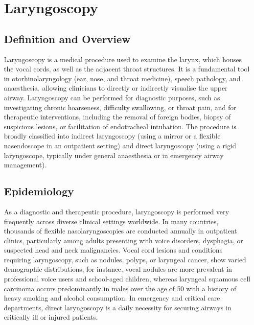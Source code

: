 \chapter{Laryngoscopy}

\section*{Definition and Overview}
Laryngoscopy is a medical procedure used to examine the larynx, which houses the vocal cords, as well as the adjacent throat structures. It is a fundamental tool in otorhinolaryngology (ear, nose, and throat medicine), speech pathology, and anaesthesia, allowing clinicians to directly or indirectly visualise the upper airway. Laryngoscopy can be performed for diagnostic purposes, such as investigating chronic hoarseness, difficulty swallowing, or throat pain, and for therapeutic interventions, including the removal of foreign bodies, biopsy of suspicious lesions, or facilitation of endotracheal intubation. The procedure is broadly classified into indirect laryngoscopy (using a mirror or a flexible nasendoscope in an outpatient setting) and direct laryngoscopy (using a rigid laryngoscope, typically under general anaesthesia or in emergency airway management).

\section*{Epidemiology}
As a diagnostic and therapeutic procedure, laryngoscopy is performed very frequently across diverse clinical settings worldwide. In many countries, thousands of flexible nasolaryngoscopies are conducted annually in outpatient clinics, particularly among adults presenting with voice disorders, dysphagia, or suspected head and neck malignancies. Vocal cord lesions and conditions requiring laryngoscopy, such as nodules, polyps, or laryngeal cancer, show varied demographic distributions; for instance, vocal nodules are more prevalent in professional voice users and school-aged children, whereas laryngeal squamous cell carcinoma occurs predominantly in males over the age of 50 with a history of heavy smoking and alcohol consumption. In emergency and critical care departments, direct laryngoscopy is a daily necessity for securing airways in critically ill or injured patients.

